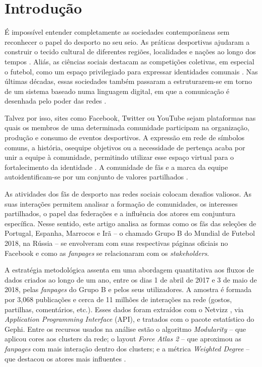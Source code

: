 \documentclass{textolivre}
\begin{document}
\section{Introdução}\label{sec-intro}
É impossível entender completamente as sociedades contemporâneas sem reconhecer o papel do desporto no seu seio. As práticas desportivas ajudaram a construir o tecido cultural de diferentes regiões, localidades e nações ao longo dos tempos \cite{jarvie2006}. Aliás, as ciências sociais destacam as competições coletivas, em especial o futebol, como um espaço privilegiado para expressar identidades comunais \cite{giulianotti2015}. Nas últimas décadas, essas sociedades também passaram a estruturarem-se em torno de um sistema baseado numa linguagem digital, em que a comunicação é desenhada pelo poder das redes \cite{castells2007}.

Talvez por isso, sites como Facebook, Twitter ou YouTube sejam plataformas nas quais os membros de uma determinada comunidade participam na organização, produção e consumo de eventos desportivos. A expressão em rede de símbolos comuns, a história, osequipe objetivos ou a necessidade de pertença acaba por unir a equipe à comunidade, permitindo utilizar esse espaço virtual para o fortalecimento da identidade \cite{haugh2016}. A comunidade de fãs e a marca da equipe autoidentificam-se por um conjunto de valores partilhados \cite{chadwick2014, newman2017, gouveia2019, lapa2019}.

As atividades dos fãs de desporto nas redes sociais colocam desafios valiosos. As suas interações permitem analisar a formação de comunidades, os interesses partilhados, o papel das federações e a influência dos atores em conjuntura específica. Nesse sentido, este artigo analisa as formas como os fãs das seleções de Portugal, Espanha, Marrocos e Irã – o chamado Grupo B do Mundial de Futebol 2018, na Rússia – se envolveram com suas respectivas páginas oficiais no Facebook e como as \emph{fanpages} se relacionaram com os \emph{stakeholders}.

A estratégia metodológica assenta em uma abordagem quantitativa aos fluxos de dados criados ao longo de um ano, entre os dias 1 de abril de 2017 e 3 de maio de 2018, pelas \emph{fanpages} do Grupo B e pelos seus utilizadores. A amostra é formada por 3,068 publicações e cerca de 11 milhões de interações na rede (gostos, partilhas, comentários, etc.). Esses dados foram extraídos com o Netvizz \cite{rieder2013}, via \emph{Application Programming Interface} (API), e tratados com o pacote estatístico do Gephi. Entre os recursos usados na análise estão o algoritmo \emph{Modularity} – que aplicou cores aos clusters da rede; o layout \emph{Force Atlas 2} – que aproximou as \emph{fanpages} com mais interação dentro dos clusters; e a métrica \emph{Weighted Degree} – que destacou os atores mais influentes \cite{barabasi2016}.
\end{document}
